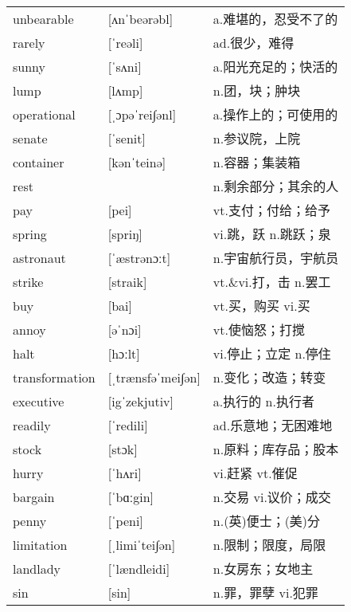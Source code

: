 \documentclass[a4paper]{article}
\begin{document}
\section{}
\begin{tabular}{l l l}

unbearable & [ʌnˈbeərəbl] & a.难堪的，忍受不了的 \\
rarely & [ˈreəli] & ad.很少，难得 \\
sunny & [ˈsʌni] & a.阳光充足的；快活的 \\
lump & [lʌmp] & n.团，块；肿块 \\
operational & [ˌɔpəˈrei∫ənl] & a.操作上的；可使用的 \\
senate & [ˈsenit] & n.参议院，上院 \\
container & [kənˈteinə] & n.容器；集装箱 \\
rest &  & n.剩余部分；其余的人 \\
pay & [pei] & vt.支付；付给；给予 \\
spring & [spriŋ] & vi.跳，跃 n.跳跃；泉 \\
astronaut & [ˈæstrənɔːt] & n.宇宙航行员，宇航员 \\
strike & [straik] & vt.\&vi.打，击 n.罢工 \\
buy & [bai] & vt.买，购买 vi.买 \\
annoy & [əˈnɔi] & vt.使恼怒；打搅 \\
halt & [hɔːlt] & vi.停止；立定 n.停住 \\
transformation & [ˌtrænsfəˈmei∫ən] & n.变化；改造；转变 \\
executive & [igˈzekjutiv] & a.执行的 n.执行者 \\
readily & [ˈredili] & ad.乐意地；无困难地 \\
stock & [stɔk] & n.原料；库存品；股本 \\
hurry & [ˈhʌri] & vi.赶紧 vt.催促 \\
bargain & [ˈbɑːgin] & n.交易 vi.议价；成交 \\
penny & [ˈpeni] & n.(英)便士；(美)分 \\
limitation & [ˌlimiˈtei∫ən] & n.限制；限度，局限 \\
landlady & [ˈlændleidi] & n.女房东；女地主 \\
sin & [sin] & n.罪，罪孽 vi.犯罪 \\

\end{tabular}
\end{document}
